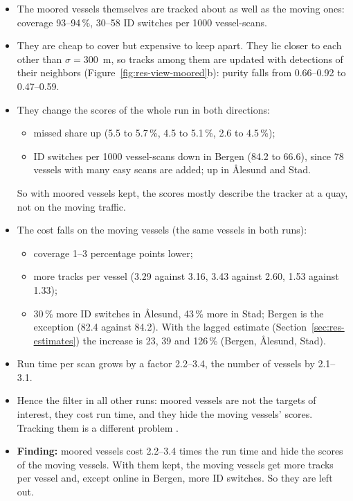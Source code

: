 \begin{itemize}
    \item The moored vessels themselves are tracked about as well as the moving ones: coverage 93--94\,\%, 30--58 ID switches per 1000 vessel-scans.
    \item They are cheap to cover but expensive to keep apart. They lie closer to each other than $\sigma = 300$~m, so tracks among them are updated with detections of their neighbors (Figure~\ref{fig:res-view-moored}b): purity falls from 0.66--0.92 to 0.47--0.59.
    \item They change the scores of the whole run in both directions:
    \begin{itemize}
        \item missed share up (5.5 to 5.7\,\%, 4.5 to 5.1\,\%, 2.6 to 4.5\,\%);
        \item ID switches per 1000 vessel-scans down in Bergen (84.2 to 66.6), since 78 vessels with many easy scans are added; up in Ålesund and Stad.
    \end{itemize}
    So with moored vessels kept, the scores mostly describe the tracker at a quay, not on the moving traffic.
    \item The cost falls on the moving vessels (the same vessels in both runs):
    \begin{itemize}
        \item coverage 1--3 percentage points lower;
        \item more tracks per vessel (3.29 against 3.16, 3.43 against 2.60, 1.53 against 1.33);
        \item 30\,\% more ID switches in Ålesund, 43\,\% more in Stad; Bergen is the exception (82.4 against 84.2). With the lagged estimate (Section~\ref{sec:res-estimates}) the increase is 23, 39 and 126\,\% (Bergen, Ålesund, Stad).
    \end{itemize}
    \item Run time per scan grows by a factor 2.2--3.4, the number of vessels by 2.1--3.1.
    \item Hence the filter in all other runs: moored vessels are not the targets of interest, they cost run time, and they hide the moving vessels' scores. Tracking them is a different problem .
    \item \textbf{Finding:} moored vessels cost 2.2--3.4 times the run time and hide the scores of the moving vessels. With them kept, the moving vessels get more tracks per vessel and, except online in Bergen, more ID switches. So they are left out.
\end{itemize}

